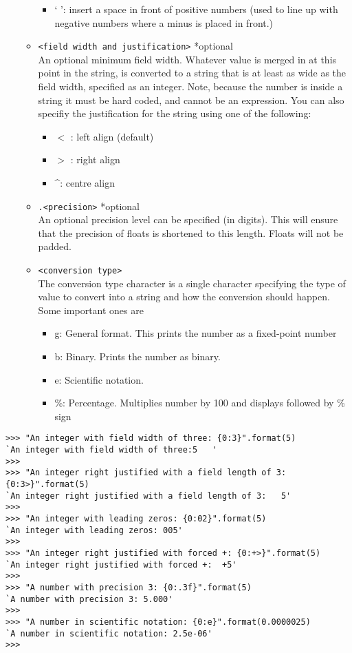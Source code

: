 \begin{enumerate}
\begin{itemize}
\begin{itemize}
	\item ` ': insert a space in front of positive numbers      (used to line up with negative numbers where a minus is      placed in front.)
\end{itemize}
	\item 
\texttt{<field width and justification>} *optional
\\     An optional minimum field width. Whatever value is merged in at    this point in the string, is converted to a string that is at least    as wide as the field width, specified as an integer. Note, because    the number is inside a string it must be hard coded, and cannot be    an expression. You can also specifiy the justification for the string using       one of the following:
\begin{itemize}
	\item $<$ : left align (default)
	\item $>$ : right align 
	\item \textasciicircum : centre align
\end{itemize}
	\item 
\texttt{.<precision>} *optional
\\        An optional precision level can be specified (in digits). This will    ensure that the precision of floats is shortened to this length.    Floats will not be padded.
	\item 
\texttt{<conversion type>}
\\         The conversion type character is a single character specifying     the type of value to convert into a string and how the     conversion should happen. Some important ones     are      
\begin{itemize}
	\item g: General format. This prints the number as a fixed-point number
	\item b: Binary. Prints the number as binary.
	\item e: Scientific notation.
	\item \%: Percentage. Multiplies number by 100 and displays followed by \% sign
\end{itemize}
\end{itemize}
\end{enumerate}
\begin{lstlisting}
>>> "An integer with field width of three: {0:3}".format(5)
`An integer with field width of three:5   '
>>>
>>> "An integer right justified with a field length of 3: {0:3>}".format(5) 
`An integer right justified with a field length of 3:   5'
>>>
>>> "An integer with leading zeros: {0:02}".format(5)
`An integer with leading zeros: 005'
>>>
>>> "An integer right justified with forced +: {0:+>}".format(5)
`An integer right justified with forced +:  +5'
>>>
>>> "A number with precision 3: {0:.3f}".format(5)
`A number with precision 3: 5.000'
>>>
>>> "A number in scientific notation: {0:e}".format(0.0000025)
`A number in scientific notation: 2.5e-06'
>>>
\end{lstlisting}

